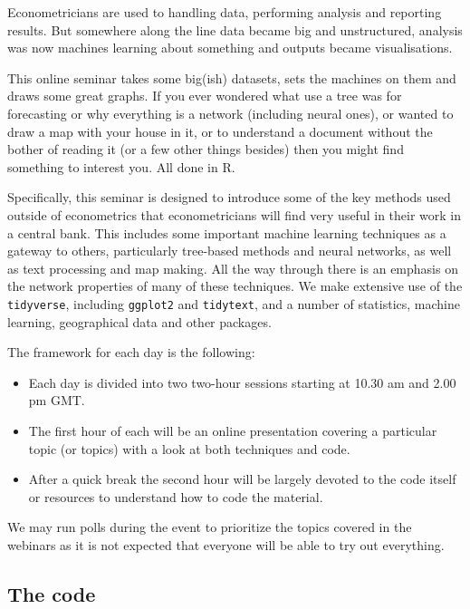 \documentclass[
  letterpaper,
]{book}
\providecommand{\tightlist}{%
  \setlength{\itemsep}{0pt}\setlength{\parskip}{0pt}}\usepackage{longtable,booktabs,array}
\begin{document}
Econometricians are used to handling data, performing analysis and
reporting results. But somewhere along the line data became big and
unstructured, analysis was now machines learning about something and
outputs became visualisations.

This online seminar takes some big(ish) datasets, sets the machines on
them and draws some great graphs. If you ever wondered what use a tree
was for forecasting or why everything is a network (including neural
ones), or wanted to draw a map with your house in it, or to understand a
document without the bother of reading it (or a few other things
besides) then you might find something to interest you. All done in R.

Specifically, this seminar is designed to introduce some of the key
methods used outside of econometrics that econometricians will find very
useful in their work in a central bank. This includes some important
machine learning techniques as a gateway to others, particularly
tree-based methods and neural networks, as well as text processing and
map making. All the way through there is an emphasis on the network
properties of many of these techniques. We make extensive use of the
\texttt{tidyverse}, including \texttt{ggplot2} and \texttt{tidytext},
and a number of statistics, machine learning, geographical data and
other packages.

The framework for each day is the following:

\begin{itemize}
\tightlist
\item
  Each day is divided into two two-hour sessions starting at 10.30 am
  and 2.00 pm GMT.
\item
  The first hour of each will be an online presentation covering a
  particular topic (or topics) with a look at both techniques and code.
\item
  After a quick break the second hour will be largely devoted to the
  code itself or resources to understand how to code the material.
\end{itemize}

We may run polls during the event to prioritize the topics covered in
the webinars as it is not expected that everyone will be able to try out
everything.

\hypertarget{the-code}{%
\subsection{The code}\label{the-code}}
\end{document}
